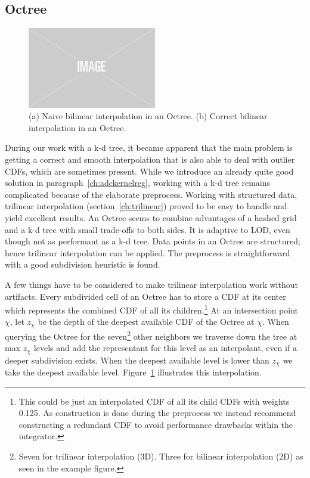 \subsection{Octree}
\label{ch:octree}

\begin{figure}
    \centering
    \includegraphics[width=0.5\textwidth]{figures/img-placeholder.png}
    \caption{(a) Naive bilinear interpolation in an Octree. (b) Correct bilinear interpolation in an Octree.}
    \label{fig:trilinearoctree}
\end{figure}

During our work with a k-d tree, it became apparent that the main problem is getting a correct and smooth interpolation that is also able to deal with outlier CDFs, which are sometimes present. While we introduce an already quite good solution in paragraph~\ref{ch:adckernelreg}, working with a k-d tree remains complicated because of the elaborate preprocess. Working with structured data, trilinear interpolation (section~\ref{ch:trilinear}) proved to be easy to handle and yield excellent results. An Octree seems to combine advantages of a hashed grid and a k-d tree with small trade-offs to both sides. It is adaptive to LOD, even though not as performant as a k-d tree. Data points in an Octree are structured; hence trilinear interpolation can be applied. The preprocess is straightforward with a good subdivision heuristic is found.

A few things have to be considered to make trilinear interpolation work without artifacts. Every subdivided cell of an Octree has to store a CDF at its center which represents the combined CDF of all its children.\footnote{This could be just an interpolated CDF of all its child CDFs with weights 0.125. As construction is done during the preprocess we instead recommend constructing a redundant CDF to avoid performance drawbacks within the integrator.} At an intersection point $\chi$, let $z_\chi$ be the depth of the deepest available CDF of the Octree at $\chi$. When querying the Octree for the seven\footnote{Seven for trilinear interpolation (3D). Three for bilinear interpolation (2D) as seen in the example figure.} other neighbors we traverse down the tree at max $z_\chi$ levels and add the representant for this level as an interpolant, even if a deeper subdivision exists. When the deepest available level is lower than $z_\chi$ we take the deepest available level. Figure~\ref{fig:trilinearoctree} illustrates this interpolation.


